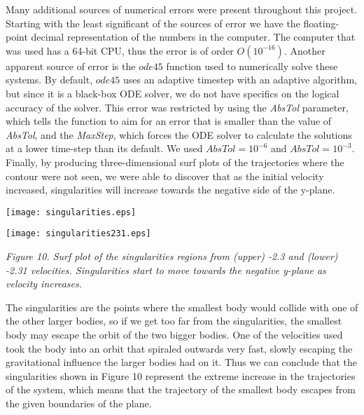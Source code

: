 \documentclass{article}
\begin{document}
Many additional sources of numerical errors were present throughout this project. Starting with the least significant of the sources of error we have the floating-point decimal representation of the numbers in the computer. The computer that was used has a 64-bit CPU, thus the error is of order $O(10^{-16})$. Another apparent source of error is the $ode45$ function used to numerically solve these systems. By default, $ode45$ uses an adaptive timestep with an adaptive algorithm, but since it is a black-box ODE solver, we do not have specifics on the logical accuracy of the solver. This error was restricted by using the \textit{AbsTol} parameter, which tells the function to aim for an error that is smaller than the value of \textit{AbsTol}, and the \textit{MaxStep}, which forces the ODE solver to calculate the solutions at a lower time-step than its default. We used $AbsTol = 10^{-6}$ and $AbsTol = 10^{-3}$. Finally, by producing three-dimensional surf plots of the trajectories where the contour were not seen, we were able to discover that as the initial velocity increased, singularities will increase towards the negative side of the y-plane.

\begin{center}
  \texttt{[image: singularities.eps]}
\end{center}

\begin{center}
  \texttt{[image: singularities231.eps]}
\end{center}

\begin{center}
   \textit{Figure 10. Surf plot of the singularities regions from (upper) -2.3 and (lower) -2.31 velocities. Singularities start to move towards the negative y-plane as velocity increases.}
\end{center}


The singularities are the points where the smallest body would collide with one of the other larger bodies, so if we get too far from the singularities, the smallest body may escape the orbit of the two bigger bodies. One of the velocities used took the body into an orbit that spiraled outwards very fast, slowly escaping the gravitational influence the larger bodies had on it. Thus we can conclude that the singularities shown in Figure 10 represent the extreme increase in the trajectories of the system, which means that the trajectory of the smallest body escapes from the given boundaries of the plane.
\end{document}
